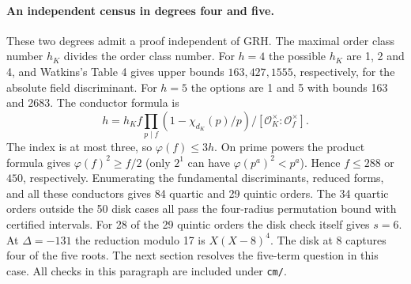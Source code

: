 \paragraph{An independent census in degrees four and five.}
These two degrees admit a proof independent of GRH. The maximal order class number $h_K$ divides the order class number. For $h=4$ the possible $h_K$ are 1, 2 and 4, and Watkins's Table 4 gives upper bounds $163,427,1555$, respectively, for the absolute field discriminant. For $h=5$ the options are 1 and 5 with bounds 163 and 2683. The conductor formula is
\[
 h=h_K f\prod_{p\mid f}(1-\chi_{d_K}(p)/p)/[\mathcal O_K^\times:\mathcal O_f^\times].
\]
The index is at most three, so $\varphi(f)\le 3h$. On prime powers the product formula gives $\varphi(f)^2\ge f/2$ (only $2^1$ can have $\varphi(p^a)^2<p^a$). Hence $f\le288$ or $450$, respectively. Enumerating the fundamental discriminants, reduced forms, and all these conductors gives 84 quartic and 29 quintic orders. The 34 quartic orders outside the 50 disk cases all pass the four-radius permutation bound with certified intervals. For 28 of the 29 quintic orders the disk check itself gives $s=6$. At $\Delta=-131$ the reduction modulo 17 is $X(X-8)^4$. The disk at 8 captures four of the five roots. The next section resolves the five-term question in this case. All checks in this paragraph are included under \texttt{cm/}.\cite{watkins}
